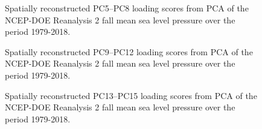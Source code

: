 \documentclass{tATO2e}
\begin{document}
\begin{appendices}
\begin{figure}
\begin{center}
		\hspace{5pt}
		\hspace{5pt}
		\caption{Spatially reconstructed PC5--PC8 loading scores from PCA of the NCEP-DOE Reanalysis 2 fall mean sea level pressure over the period 1979-2018.}
		\label{mslp_5_8}
	\end{center}
\end{figure}

\begin{figure}
	\begin{center}
		\hspace{5pt}
		\hspace{5pt}
		
		\hspace{5pt}
		\hspace{5pt}
		\caption{Spatially reconstructed PC9--PC12 loading scores from PCA of the NCEP-DOE Reanalysis 2 fall mean sea level pressure over the period 1979-2018.}
		\label{mslp_9_12}
	\end{center}
\end{figure}

\begin{figure}
	\begin{center}
		\hspace{5pt}
		\hspace{5pt}
		
		\hspace{5pt}
		\caption{Spatially reconstructed PC13--PC15 loading scores from PCA of the NCEP-DOE Reanalysis 2 fall mean sea level pressure over the period 1979-2018.}
		\label{mslp_13_15}
	\end{center}
\end{figure}


\end{appendices}
\end{document}
